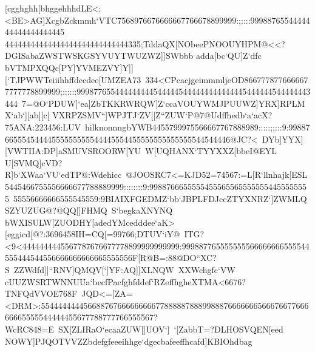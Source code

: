 {{{ [cgghghh[bhggehhhdLE<;<BE>AG]XcgbZckmmh`VTC7568976676666667766678899999:;::::9998876554444444444444444445%
 44444444444444444444444444444335;TddaQX[NObeePNOOUYHPM@<<?DGISabaZWSTWSKGSYVUYTWUZWZ]]SWbbb%
 adda[bc`QU]Z`dfc}
 \hbox{bVTMPXQQc[PY]YVMEZVY]Y]][`TJPWWTeiiihhffdccdee[UMZEA73%
 334<CPcacjgeimmmljeOD8667778776666677777778899999;::::::9998776554444444445444445444444444444445444444544444443444%
 7=@O`PDUW]`ea]ZbTKKRWRQW]Z`ccaVOUYWMJPUUWZ]YRX]RPLM%
 X`ab`][ab][c[}
 \hbox{VXRPZSMV``]WPJTJ`ZV[[Z``ZUW`P@7@Udffhedb`a`acX?75ANA:223456:LUV%
 hilknonnngbYWB4455799975566667767888989:::::;;:::9:9988766555454444555555555544445554455555555555555544544446@JC?<%
 DYb]YYX][VWTIIA:DP]aSMUVSROORW[YU%
 W[UQHANX`TYYXXZ[bbeI@EYL}
 \hbox{U[SVMQ]cVD?R]b`XWaa`VU`edTP@:Wdehicc%
 @JOOSRC7<=KJD52=74567:=L[R`llnhajk[ESL5445466755556666677788889999::::::::9:99887666555554555655655555554455555555%
 55556666666555545559:9BIAIXFGEDMZ`bb`JBPLFDJccZTYXNRZ`]ZWMLQSZYUZUG@?@QQ[]FHMQ%
 S`begkaXNYNQ}
 \hbox{bWXISULW[ZUODHY[adedYMcedddee`aK>[eggicd[@?:3696458IH=CQ[=99766;DTUV`iY@%
 ITG?<9<4444444445567787676677778899999999999:999887765555555566666666555544555444544556666666666665555556F[R@B=:88@DO``XC?S%
 ZZWdfd]]``RNV]QMQV[`]YF:AQ]]XLNQW%
 XXWchgfc`VW}
 \hbox{cUUZWSRTWNNUUa`becfPacfghfddef`RZeffhgheXTMA<6676?TNFQdVVOE768F%
 JQD<=[ZA=<DRM>:55444444445668876766666666677888887888998887666666656667667766666665555544444455677788777766555567?WcRC848=E%
 SX[ZLIRaO`ecaaZUW[]UOV`]%
 `[ZabbT=?DLHOSVQEN[eed}
 \hbox{NOWY]PJQOTVVZZbdefgfeeeihhge`dgecbafeeffhcafd]KBIOhdbag%
}}}
